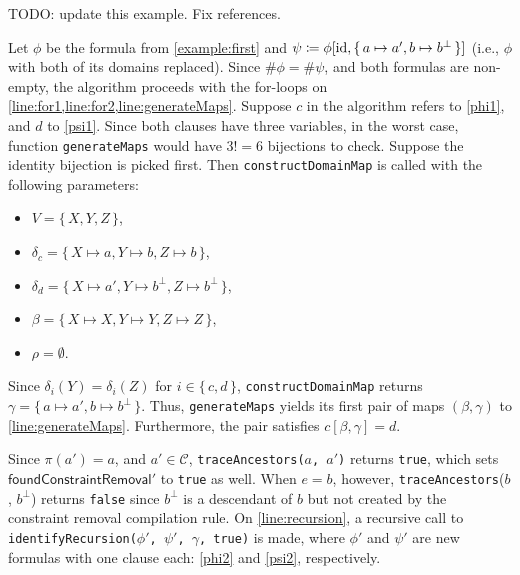 TODO: update this example. Fix references.
\begin{example} \label{example}
  Let $\phi$ be the formula from \cref{example:first} and $\psi \coloneqq \phi[\operatorname{id}, \{\, a \mapsto a', b \mapsto b^\bot \,\}]$ (i.e., $\phi$ with both of its domains replaced). Since $\#\phi = \#\psi$, and both formulas are non-empty, the algorithm proceeds with the for-loops on \cref{line:for1,line:for2,line:generateMaps}. Suppose $c$ in the algorithm refers to \cref{phi1}, and $d$ to \cref{psi1}. Since both clauses have three variables, in the worst case, function \texttt{generateMaps} would have $3!=6$ bijections to check. Suppose the identity bijection is picked first. Then \texttt{constructDomainMap} is called with the following parameters:
  \begin{itemize}
  \item $V = \{\, X, Y, Z \,\}$,
  \item $\delta_c = \{\, X \mapsto a, Y \mapsto b, Z \mapsto b \,\}$,
  \item $\delta_d = \{\, X \mapsto a', Y \mapsto b^\bot, Z \mapsto b^\bot \,\}$,
  \item $\beta = \{\, X \mapsto X, Y \mapsto Y, Z \mapsto Z \,\}$,
  \item $\rho = \emptyset$.
  \end{itemize}
  Since $\delta_i(Y) = \delta_i(Z)$ for $i \in \{\, c, d \,\}$, \texttt{constructDomainMap} returns $\gamma = \{\, a \mapsto a', b \mapsto b^\bot \,\}$. Thus, \texttt{generateMaps} yields its first pair of maps $(\beta, \gamma)$ to \cref{line:generateMaps}. Furthermore, the pair satisfies $c[\beta, \gamma] = d$.

  Since $\pi(a') = a$, and $a' \in \mathcal{C}$, \texttt{traceAncestors($a$, $a'$)} returns \texttt{true}, which sets $\textsf{foundConstraintRemoval}'$ to \texttt{true} as well. When $e = b$, however, \texttt{traceAncestors}($b$, $b^\bot$) returns \texttt{false} since $b^\bot$ is a descendant of $b$ but not created by the constraint removal compilation rule. On \cref{line:recursion}, a recursive call to \texttt{identifyRecursion($\phi'$, $\psi'$, $\gamma$, true)} is made, where $\phi'$ and $\psi'$ are new formulas with one clause each: \cref{phi2} and \cref{psi2}, respectively.


\end{example}
